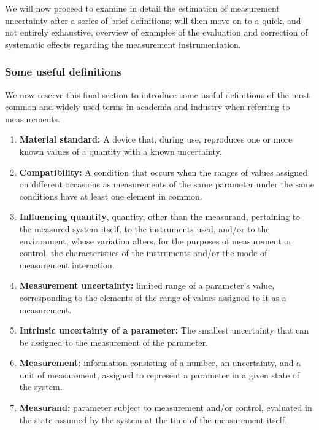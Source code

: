 \documentclass[../main.tex]{subfiles}
\begin{document}
We will now proceed to examine in detail the estimation of measurement uncertainty after a series of brief definitions; will then move on to a quick, and not entirely exhaustive, overview of examples of the evaluation and correction of systematic effects regarding the measurement instrumentation.

\subsubsection{Some useful definitions} %

We now reserve this final section to introduce some useful definitions of the most common and widely used terms in academia and industry when referring to measurements.

\begin{enumerate}
	\item[\textbf{-}]\textbf{Material standard:} A device that, during use, reproduces one or more known values of a quantity with a known uncertainty.
	
	\item[\textbf{-}]\textbf{Compatibility:} A condition that occurs when the ranges of values assigned on different occasions as measurements of the same parameter under the same conditions have at least one element in common.
	
	\item[\textbf{-}]\textbf{Influencing quantity}, quantity, other than the measurand, pertaining to the measured system itself, to the instruments used, and/or to the environment, whose variation alters, for the purposes of measurement or control, the characteristics of the instruments and/or the mode of measurement interaction. 
	
	\item[\textbf{-}]\textbf{Measurement uncertainty:}  limited range of a parameter’s value, corresponding to the elements of the range of values assigned to it as a measurement.
	
	\item[\textbf{-}]\textbf{Intrinsic uncertainty of a parameter:} The smallest uncertainty that can be assigned to the measurement of the parameter.
	
	\item[\textbf{-}]\textbf{Measurement:} information consisting of a number, an uncertainty, and a unit of measurement, assigned to represent a parameter in a given state of the system.

	\item[\textbf{-}]\textbf{Measurand:} parameter subject to measurement and/or control, evaluated in the state assumed by the system at the time of the measurement itself.
	

\end{enumerate}
\end{document}
